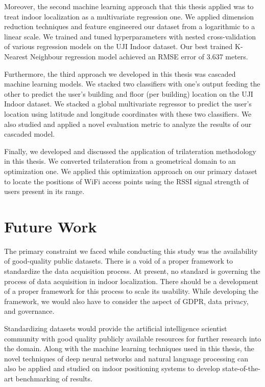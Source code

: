\documentclass[a4paper,singleside,12pt]{report} %
\begin{document}
			Moreover, the second machine learning approach that this thesis applied was to treat indoor localization as a multivariate regression one. 
			We applied dimension reduction techniques and feature engineered our dataset from a logarithmic to a linear scale. 
			We trained and tuned hyperparameters with nested cross-validation of various regression models on the UJI Indoor dataset. 
			Our best trained K-Nearest Neighbour regression model achieved an RMSE error of 3.637 meters.
			
			Furthermore, the third approach we developed in this thesis was cascaded machine learning models. 
			We stacked two classifiers with one's output feeding the other to predict the user's building and floor (per building) location on the UJI Indoor dataset. 
			We stacked a global multivariate regressor to predict the user's location using latitude and longitude coordinates with these two classifiers. 
			We also studied and applied a novel evaluation metric to analyze the results of our cascaded model.
			
			Finally, we developed and discussed the application of trilateration methodology in this thesis. 
			We converted trilateration from a geometrical domain to an optimization one. 
			We applied this optimization approach on our primary dataset to locate the positions of WiFi access points using the RSSI signal strength of users present in its range. 

		\section{Future Work}
			The primary constraint we faced while conducting this study was the availability of good-quality public datasets. 
			There is a void of a proper framework to standardize the data acquisition process. 
			At present, no standard is governing the process of data acquisition in indoor localization. 
			There should be a development of a proper framework for this process to scale its usability. 
			While developing the framework, we would also have to consider the aspect of GDPR, data privacy, and governance.
			
			Standardizing datasets would provide the artificial intelligence scientist community with good quality publicly available resources for further research into the domain. 
			Along with the machine learning techniques used in this thesis, the novel techniques of deep neural networks and natural language processing can also be applied and studied on indoor positioning systems to develop state-of-the-art benchmarking of results.   
			
\end{document}
